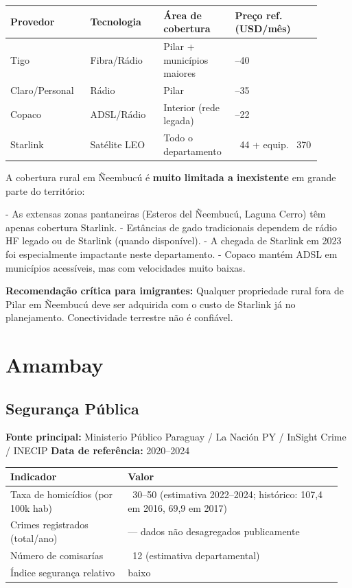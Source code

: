 {\small
\setlength{\tabcolsep}{3pt}
\renewcommand{\arraystretch}{1.12}
\begin{tabularx}{\linewidth}{>{\raggedright\arraybackslash}p{0.24\linewidth} >{\raggedright\arraybackslash}p{0.22\linewidth} >{\raggedright\arraybackslash}p{0.18\linewidth} >{\raggedright\arraybackslash}p{0.26\linewidth}}
\toprule
Provedor & Tecnologia & Área de cobertura & Preço ref. (USD/mês) \\
\midrule
Tigo & Fibra/Rádio & Pilar + municípios maiores & 18--40 \\
Claro/Personal & Rádio & Pilar & 15--35 \\
Copaco & ADSL/Rádio & Interior (rede legada) & 10--22 \\
Starlink & Satélite LEO & Todo o departamento & ~44 + equip. ~370 \\
\bottomrule
\end{tabularx}
}


A cobertura rural em Ñeembucú é \textbf{muito limitada a inexistente} em grande parte do território:

- As extensas zonas pantaneiras (Esteros del Ñeembucú, Laguna Cerro) têm apenas cobertura Starlink.
- Estâncias de gado tradicionais dependem de rádio HF legado ou de Starlink (quando disponível).
- A chegada de Starlink em 2023 foi especialmente impactante neste departamento.
- Copaco mantém ADSL em municípios acessíveis, mas com velocidades muito baixas.

\textbf{Recomendação crítica para imigrantes:} Qualquer propriedade rural fora de Pilar em Ñeembucú deve ser adquirida com o custo de Starlink já no planejamento. Conectividade terrestre não é confiável.





\clearpage
\section{Amambay}
\label{sec:dept_13_Amambay}

\subsection{Segurança Pública}

\textbf{Fonte principal:} Ministerio Público Paraguay / La Nación PY / InSight Crime / INECIP
\textbf{Data de referência:} 2020--2024


{\small
\setlength{\tabcolsep}{3pt}
\renewcommand{\arraystretch}{1.12}
\begin{tabularx}{\linewidth}{>{\raggedright\arraybackslash}p{0.34\linewidth} >{\raggedright\arraybackslash}p{0.62\linewidth}}
\toprule
Indicador & Valor \\
\midrule
Taxa de homicídios (por 100k hab) & ~30--50 (estimativa 2022--2024; histórico: 107,4 em 2016, 69,9 em 2017) \\
Crimes registrados (total/ano) & --- dados não desagregados publicamente \\
Número de comisarías & ~12 (estimativa departamental) \\
Índice segurança relativo & baixo \\
\bottomrule
\end{tabularx}
}


